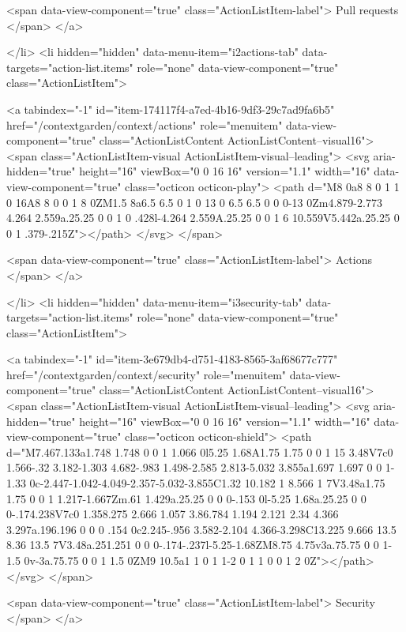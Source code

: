        <span data-view-component="true" class="ActionListItem-label">
          Pull requests
</span>      
</a>
  
</li>
        <li hidden="hidden" data-menu-item="i2actions-tab" data-targets="action-list.items" role="none" data-view-component="true" class="ActionListItem">
    
    
    <a tabindex="-1" id="item-174117f4-a7ed-4b16-9df3-29c7ad9fa6b5" href="/contextgarden/context/actions" role="menuitem" data-view-component="true" class="ActionListContent ActionListContent--visual16">
        <span class="ActionListItem-visual ActionListItem-visual--leading">
          <svg aria-hidden="true" height="16" viewBox="0 0 16 16" version="1.1" width="16" data-view-component="true" class="octicon octicon-play">
    <path d="M8 0a8 8 0 1 1 0 16A8 8 0 0 1 8 0ZM1.5 8a6.5 6.5 0 1 0 13 0 6.5 6.5 0 0 0-13 0Zm4.879-2.773 4.264 2.559a.25.25 0 0 1 0 .428l-4.264 2.559A.25.25 0 0 1 6 10.559V5.442a.25.25 0 0 1 .379-.215Z"></path>
</svg>
        </span>
      
        <span data-view-component="true" class="ActionListItem-label">
          Actions
</span>      
</a>
  
</li>
        <li hidden="hidden" data-menu-item="i3security-tab" data-targets="action-list.items" role="none" data-view-component="true" class="ActionListItem">
    
    
    <a tabindex="-1" id="item-3e679db4-d751-4183-8565-3af68677c777" href="/contextgarden/context/security" role="menuitem" data-view-component="true" class="ActionListContent ActionListContent--visual16">
        <span class="ActionListItem-visual ActionListItem-visual--leading">
          <svg aria-hidden="true" height="16" viewBox="0 0 16 16" version="1.1" width="16" data-view-component="true" class="octicon octicon-shield">
    <path d="M7.467.133a1.748 1.748 0 0 1 1.066 0l5.25 1.68A1.75 1.75 0 0 1 15 3.48V7c0 1.566-.32 3.182-1.303 4.682-.983 1.498-2.585 2.813-5.032 3.855a1.697 1.697 0 0 1-1.33 0c-2.447-1.042-4.049-2.357-5.032-3.855C1.32 10.182 1 8.566 1 7V3.48a1.75 1.75 0 0 1 1.217-1.667Zm.61 1.429a.25.25 0 0 0-.153 0l-5.25 1.68a.25.25 0 0 0-.174.238V7c0 1.358.275 2.666 1.057 3.86.784 1.194 2.121 2.34 4.366 3.297a.196.196 0 0 0 .154 0c2.245-.956 3.582-2.104 4.366-3.298C13.225 9.666 13.5 8.36 13.5 7V3.48a.251.251 0 0 0-.174-.237l-5.25-1.68ZM8.75 4.75v3a.75.75 0 0 1-1.5 0v-3a.75.75 0 0 1 1.5 0ZM9 10.5a1 1 0 1 1-2 0 1 1 0 0 1 2 0Z"></path>
</svg>
        </span>
      
        <span data-view-component="true" class="ActionListItem-label">
          Security
</span>      
</a>
  
